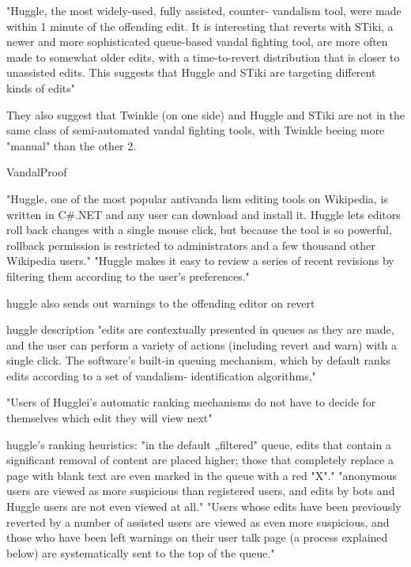 \cite{GeiHal2013}
"Huggle, the most widely-used, fully assisted, counter-
vandalism tool, were made within 1 minute of the
offending edit. It is interesting that reverts with STiki, a
newer and more sophisticated queue-based vandal fighting
tool, are more often made to somewhat older edits, with a
time-to-revert distribution that is closer to unassisted edits.
This suggests that Huggle and STiki are targeting different
kinds of edits"

They also suggest that Twinkle (on one side) and Huggle and STiki are not in the same class of semi-automated vandal fighting tools, with Twinkle beeing more "manual" than the other 2.

VandalProof~\cite{HalRied2012}

"Huggle, one of the most popular
antivanda lism editing tools on
Wikipedia, is written in C\#.NET
and any user can download and
install it. Huggle lets editors roll back
changes with a single mouse click,
but because the tool is so powerful,
rollback permission is restricted to
administrators and a few thousand
other Wikipedia users."
"Huggle makes it easy to review
a series of recent revisions by
filtering them according to the
user’s preferences."~\cite{HalRied2012}

huggle also sends out warnings to the offending editor on revert~\cite{HalRied2012}

\cite{GeiRib2010}
huggle description
"edits are contextually
presented in queues as they are made, and the user can
perform a variety of actions (including revert and warn) with
a single click. The software's built-in queuing mechanism,
which by default ranks edits according to a set of vandalism-
identification algorithms,"

"Users of Hugglei's automatic
ranking mechanisms do not have to decide for themselves
which edit they will view next"

huggle's ranking heuristics:
"in the default „filtered" queue, edits that contain a significant removal of content are placed
higher; those that completely replace a page with blank text
are even marked in the queue with a red "X"."
"anonymous users are viewed as more suspicious than
registered users, and edits by bots and Huggle users are not
even viewed at all."
"Users whose edits have been previously
reverted by a number of assisted users are viewed as even
more suspicious, and those who have been left warnings on
their user talk page (a process explained below) are
systematically sent to the top of the queue."


